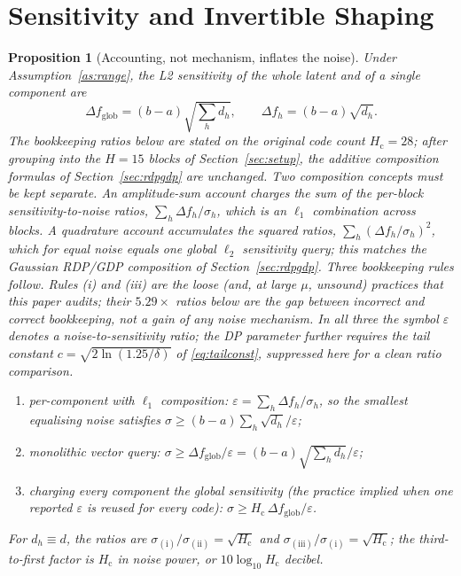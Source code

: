 \documentclass[10pt,twocolumn,letterpaper]{article}
\theoremstyle{plain}
\newtheorem{proposition}{Proposition}
\theoremstyle{definition}
\begin{document}
\section{Sensitivity and Invertible Shaping}
\label{sec:sensitivity}

\begin{proposition}[Accounting, not mechanism, inflates the noise]
\label{pr:inflation}
Under Assumption~\ref{as:range}, the L2 sensitivity of the whole latent and of
a single component are
\begin{equation}
\Delta f_{\mathrm{glob}}=(b-a)\sqrt{{\textstyle\sum_h d_h}},
\qquad
\Delta f_h=(b-a)\sqrt{d_h}.
\label{eq:sens}
\end{equation}
The bookkeeping ratios below are stated on the original code count
$H_{\mathrm c}=28$; after grouping into the $H=15$ blocks of
Section~\ref{sec:setup}, the additive composition formulas of
Section~\ref{sec:rdpgdp} are unchanged. Two composition concepts must be kept
separate. An \emph{amplitude-sum} account charges the sum of the per-block
sensitivity-to-noise ratios, $\sum_h\Delta f_h/\sigma_h$, which is an $\ell_1$
combination across blocks. A \emph{quadrature} account accumulates the squared
ratios, $\sum_h(\Delta f_h/\sigma_h)^2$, which for equal noise equals one global
$\ell_2$ sensitivity query; this matches the Gaussian RDP/GDP composition of
Section~\ref{sec:rdpgdp}. Three bookkeeping rules follow. Rules (i) and (iii)
are the loose (and, at large $\mu$, unsound) practices that this paper audits;
their $5.29\times$ ratios below are the gap between incorrect and correct
bookkeeping, not a gain of any noise mechanism. In all three the symbol
$\varepsilon$ denotes a noise-to-sensitivity ratio; the DP parameter further
requires the tail constant $c=\sqrt{2\ln(1.25/\delta)}$ of
\eqref{eq:tailconst}, suppressed here for a clean ratio comparison.
\begin{enumerate}
\item[(i)] \emph{per-component with $\ell_1$ composition:}
$\varepsilon=\sum_{h}\Delta f_h/\sigma_h$, so the smallest equalising noise
satisfies $\sigma\ge(b-a)\textstyle\sum_h\sqrt{d_h}/\varepsilon$;
\item[(ii)] \emph{monolithic vector query:}
$\sigma\ge\Delta f_{\mathrm{glob}}/\varepsilon
=(b-a)\sqrt{{\textstyle\sum_h d_h}}/\varepsilon$;
\item[(iii)] \emph{charging every component the global sensitivity} (the
practice implied when one reported $\varepsilon$ is reused for every code):
$\sigma\ge H_{\mathrm c}\,\Delta f_{\mathrm{glob}}/\varepsilon$.
\end{enumerate}
For $d_h\equiv d$, the ratios are
$\sigma_{\mathrm{(i)}}/\sigma_{\mathrm{(ii)}}=\sqrt{H_{\mathrm c}}$ and
$\sigma_{\mathrm{(iii)}}/\sigma_{\mathrm{(i)}}=\sqrt{H_{\mathrm c}}$; the
third-to-first factor is $H_{\mathrm c}$ in noise power, or
$10\log_{10}H_{\mathrm c}$ decibel.
\end{proposition}
\end{document}
